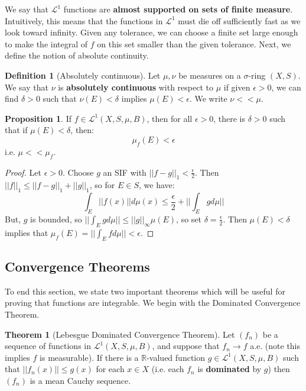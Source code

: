 \documentclass[11pt, oneside]{amsart}   	%
\theoremstyle{definition}
\newtheorem{definition}{Definition}[section]
\newtheorem{theorem}{Theorem}[section]
\newtheorem{prop}{Proposition}[section]
\begin{document}
	We say that $\mathcal L^1$ functions are \textbf{almost supported on sets of finite measure}. Intuitively, this means that 
	the functions in $\mathcal L^1$ must die off sufficiently fast as we look toward infinity. Given any tolerance, we can 
	choose a finite set large enough to make the integral of $f$ on this set smaller than the given tolerance. Next, 
	we define the notion of absolute continuity.
	
	\begin{definition}[Absolutely continuous]
		Let $\mu, \nu$ be measures on a $\sigma$-ring $(X, S)$. We say that $\nu$ is \textbf{absolutely continuous} with 
		respect to $\mu$ if given $\epsilon > 0$, we can find $\delta > 0$ such that $\nu(E) < \delta$ implies $\mu(E) < 
		\epsilon$. We write $\nu << \mu$. 
	\end{definition}
	
	\begin{prop}
		If $f\in\mathcal L^1(X, S, \mu, B)$, then for all $\epsilon > 0$, there is $\delta > 0$ such that if $\mu(E) < \delta$, 
		then:
		$$
			\mu_f(E) < \epsilon
		$$
		i.e. $\mu << \mu_f$. 
	\end{prop}
	
	\begin{proof}
		Let $\epsilon > 0$. Choose $g$ an SIF with $||f - g||_1 < \frac{\epsilon}{2}$. Then $||f||_1\leq ||f - g||_1 + ||g||_1$, 
		so for $E\in S$, we have:
		$$
			\int_E ||f(x)||d\mu(x)\leq\frac{\epsilon}{2} + ||\int_E gd\mu||
		$$
		But, $g$ is bounded, so $||\int_E gd\mu|| \leq ||g||_\infty\mu(E)$, so set $\delta = \frac{\epsilon}{2}$. Then $\mu(E) 
		< \delta$ implies that $\mu_f(E) = ||\int_E fd\mu|| < \epsilon$.
	\end{proof}
	
	\subsection{Convergence Theorems}
	
	To end this section, we state two important theorems which will be useful for proving that functions are integrable. We 
	begin with the Dominated Convergence Theorem.
	
	\begin{theorem}[Lebesgue Dominated Convergence Theorem]
		Let $(f_n)$ be a sequence of functions in $\mathcal L^1(X, S, \mu, B)$, and suppose that $f_n\rightarrow f$ a.e. 
		(note this implies $f$ is measurable). If there is a $\mathbb R$-valued function $g\in\mathcal L^1(X, S, \mu, B)$ 
		such that $||f_n(x)||\leq g(x)$ for each $x\in X$ (i.e. each $f_n$ is \textbf{dominated} by $g$) then $(f_n)$ is a 
		mean Cauchy sequence. 
	\end{theorem}
	
\end{document}
